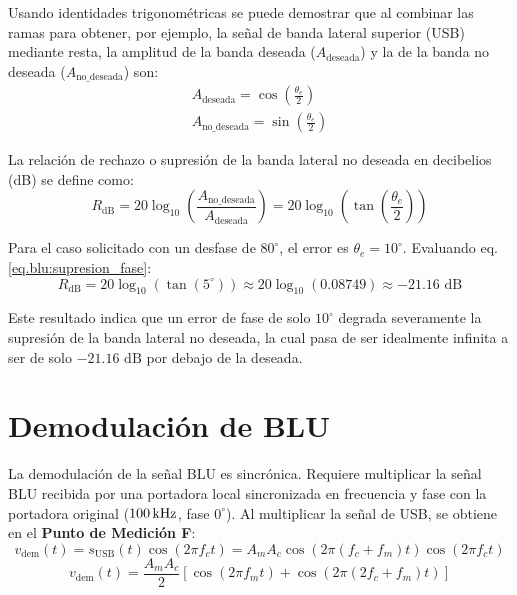 Usando identidades trigonométricas se puede demostrar que al combinar las ramas para obtener, por ejemplo, la
señal de banda lateral superior (USB) mediante resta, la amplitud de la banda deseada ($A_{\text{deseada}}$)
y la de la banda no deseada ($A_{\text{no\_deseada}}$) son:
\begin{gather}
    A_{\text{deseada}} = \cos\left(\frac{\theta_e}{2}\right) \\
    A_{\text{no\_deseada}} = \sin\left(\frac{\theta_e}{2}\right)
\end{gather}

La relación de rechazo o supresión de la banda lateral no deseada en decibelios (dB) se define como:
\begin{equation}
    R_{\text{dB}} = 20 \log_{10} \left( \frac{A_{\text{no\_deseada}}}{A_{\text{deseada}}} \right) = 20 \log_{10} \left( \tan\left(\frac{\theta_e}{2}\right) \right)
    \label{eq.blu:supresion_fase}
\end{equation}

Para el caso solicitado con un desfase de $80^\circ$, el error es $\theta_e = 10^\circ$. Evaluando eq. \ref{eq.blu:supresion_fase}:
\begin{equation}
    R_{\text{dB}} = 20 \log_{10} \left( \tan(5^\circ) \right) \approx 20 \log_{10} (0.08749) \approx -21.16\text{ dB}
\end{equation}

Este resultado indica que un error de fase de solo $10^\circ$ degrada severamente la supresión de la banda lateral
no deseada, la cual pasa de ser idealmente infinita a ser de solo $-21.16\text{ dB}$ por debajo de la deseada.

\section{Demodulación de BLU}
La demodulación de la señal BLU es sincrónica. Requiere multiplicar la señal BLU recibida por una portadora local
sincronizada en frecuencia y fase con la portadora original ($100\,\mathrm{kHz}$, fase $0^\circ$).
Al multiplicar la señal de USB, se obtiene en el \textbf{Punto de Medición F}:
\begin{equation}
    v_{\text{dem}}(t) = s_{\text{USB}}(t) \cos(2\pi f_c t) = A_m A_c \cos(2\pi (f_c + f_m) t) \cos(2\pi f_c t)
\end{equation}
\begin{equation}
    v_{\text{dem}}(t) = \frac{A_m A_c}{2} [\cos(2\pi f_m t) + \cos(2\pi (2f_c + f_m) t)]
\end{equation}

